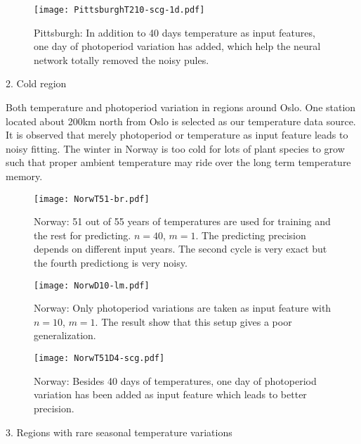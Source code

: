 \documentclass[paper=a4, fontsize=12pt]{scrartcl}	%
\numberwithin{equation}{section}					%
\numberwithin{figure}{section}					%
\numberwithin{table}{section}					%
\begin{document}
\begin{figure}[H]
\centering
\texttt{[image: PittsburghT210-scg-1d.pdf]}
\caption{Pittsburgh: In addition to 40 days temperature as input features, one day of photoperiod variation has added, which help the neural network totally removed the noisy pules.}
\label{fig:pittsTD}
\end{figure}

2. Cold region

Both temperature and photoperiod variation in regions around Oslo. One station located about 200km north from Oslo is selected as our temperature data source. It is observed that merely photoperiod or temperature as input feature leads to noisy fitting. The winter in Norway is too cold for lots of plant species to grow such that proper ambient temperature may ride over the long term temperature memory.  
\begin{figure}[H]
\centering
\texttt{[image: NorwT51-br.pdf]}
\caption{Norway: 51 out of 55 years of temperatures are used for training and the rest for predicting. $n=40$, $m=1$. The predicting precision depends on different input years. The second cycle is very exact but the fourth predictiong is very noisy.}
\label{fig:NorwayT}
\end{figure}

\begin{figure}[H]
\centering
\texttt{[image: NorwD10-lm.pdf]}
\caption{Norway: Only photoperiod variations are taken as input feature with $n=10$, $m=1$. The result show that this setup gives a poor generalization.}
\label{fig:NorwayD}
\end{figure}

\begin{figure}[H]
\centering
\texttt{[image: NorwT51D4-scg.pdf]}
\caption{Norway: Besides 40 days of temperatures, one day of photoperiod variation has been added as input feature which leads to better precision. }
\label{fig:NorwayTD}
\end{figure}
3. Regions with rare seasonal temperature variations
\end{document}
